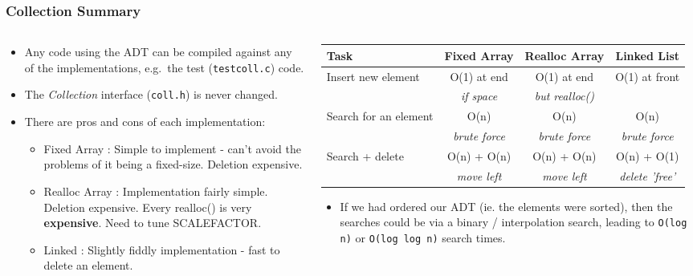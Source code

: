 
\begin{frame}[fragile]
\frametitle{Collection Summary}
\begin{columns}[T]

\begin{column}{0.45\textwidth}
\begin{itemize}[<+->]
\item Any code using the ADT can be compiled against any of the implementations, e.g.~the test (\verb^testcoll.c^) code. 
\item The {\em Collection} interface ({\verb^coll.h^}) is never changed.
\item There are pros and cons of each implementation:
\begin{itemize}[<+->]
\item Fixed Array : Simple to implement - can't avoid the problems of it being a fixed-size. Deletion expensive.
\item Realloc Array : Implementation fairly simple. Deletion expensive. Every realloc() is very {\bf expensive}. Need to tune SCALEFACTOR.
\item Linked : Slightly fiddly implementation - fast to delete an element.
\end{itemize}
\end{itemize}
\end{column}

\pause
\begin{column}{0.45\textwidth}
{\tiny
\begin{tabular}{|l|c|c|c|}\hline
Task                 & Fixed Array      & Realloc Array      & Linked List        \\\hline
Insert new element   & O(1) at end      & O(1) at end        & O(1) at front      \\
                     & {\em if space}   & {\em but realloc()}&                    \\\hline
Search for an element& O(n)             & O(n)               & O(n)               \\
                     & {\em brute force}& {\em brute force}  & {\em brute force}  \\\hline
Search + delete      & O(n) + O(n)      & O(n) + O(n)        & O(n) + O(1)        \\
                     & {\em move left}  & {\em move left}    & {\em delete 'free'}\\\hline
\end{tabular}
}
\begin{itemize}[<+->]
\item If we had ordered our ADT (ie. the elements were sorted), then the searches could be via a
binary / interpolation search, leading to \verb^O(log n)^ or \verb^O(log log n)^ search times.
\end{itemize}
\end{column}

\end{columns}
\end{frame}

